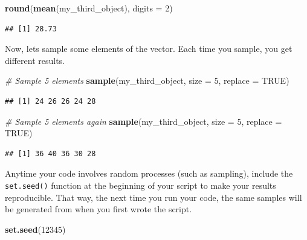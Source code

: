 \documentclass[
]{article}
\newenvironment{Shaded}{\begin{snugshade}}{\end{snugshade}}
\newcommand{\AttributeTok}[1]{\textcolor[rgb]{0.13,0.29,0.53}{#1}}
\newcommand{\CommentTok}[1]{\textcolor[rgb]{0.56,0.35,0.01}{\textit{#1}}}
\newcommand{\ConstantTok}[1]{\textcolor[rgb]{0.56,0.35,0.01}{#1}}
\newcommand{\DecValTok}[1]{\textcolor[rgb]{0.00,0.00,0.81}{#1}}
\newcommand{\FunctionTok}[1]{\textcolor[rgb]{0.13,0.29,0.53}{\textbf{#1}}}
\newcommand{\NormalTok}[1]{#1}
\begin{document}
\begin{Shaded}
\begin{Highlighting}[]
\FunctionTok{round}\NormalTok{(}\FunctionTok{mean}\NormalTok{(my\_third\_object), }\AttributeTok{digits =} \DecValTok{2}\NormalTok{)}
\end{Highlighting}
\end{Shaded}

\begin{verbatim}
## [1] 28.73
\end{verbatim}

Now, lets sample some elements of the vector. Each time you sample, you
get different results.

\begin{Shaded}
\begin{Highlighting}[]
\CommentTok{\# Sample 5 elements}
\FunctionTok{sample}\NormalTok{(my\_third\_object, }\AttributeTok{size =} \DecValTok{5}\NormalTok{, }\AttributeTok{replace =} \ConstantTok{TRUE}\NormalTok{)}
\end{Highlighting}
\end{Shaded}

\begin{verbatim}
## [1] 24 26 26 24 28
\end{verbatim}

\begin{Shaded}
\begin{Highlighting}[]
\CommentTok{\# Sample 5 elements again}
\FunctionTok{sample}\NormalTok{(my\_third\_object, }\AttributeTok{size =} \DecValTok{5}\NormalTok{, }\AttributeTok{replace =} \ConstantTok{TRUE}\NormalTok{)}
\end{Highlighting}
\end{Shaded}

\begin{verbatim}
## [1] 36 40 36 30 28
\end{verbatim}

Anytime your code involves random processes (such as sampling), include
the \texttt{set.seed()} function at the beginning of your script to make
your results reproducible. That way, the next time you run your code,
the same samples will be generated from when you first wrote the script.

\begin{Shaded}
\begin{Highlighting}[]
\FunctionTok{set.seed}\NormalTok{(}\DecValTok{12345}\NormalTok{)}
\end{Highlighting}
\end{Shaded}
\end{document}
